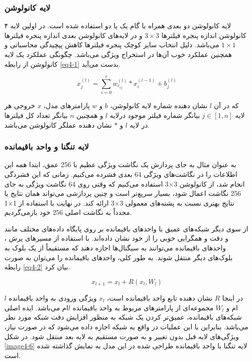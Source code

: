 \subsubsection{لایه كانولوشن}
۴ لایه کانولوشن دو بعدی همراه با گام   یک یا دو استفاده شده است. در اولین لایه کانولوشن‌ اندازه پنجره فیلترها $3 \times 3$ و در لایه‌های کانولوشن بعدی اندازه پنجره فیلترها $1 \times 1$ می‌باشد. دلیل انتخاب سایز کوچک پنجره فیلترها کاهش پیچیدگی محاسباتی و همچنین عملکرد خوب آن‌ها در استخراج ویژگی می‌باشد. چگونگی عملکرد یک لایه کانولوشن از رابطه \ref{eq4-1} بدست می‌آید.

\begin{equation}	
x_j^{(l)} =\sum_{i=0}^{c} w_{c_{ij}}^{(l)}\ast x_i^{(l-1) }+ b_j^{(l)} 
\label{eq4-1}
\end{equation}

\noindent
که در آن $l$ نشان دهنده شماره لایه کانولوشن، $b$ و $w$ پارامترهای مدل، $x$ خروجی هر لایه $j\in[1,n]$ بیانگر شماره فیلتر موجود درلایه $l$ و همچنین $n$ بیانگر تعداد کل فیلترها در لایه $l$ و $\ast$ نشان دهنده عملگر کانولوشن می‌باشد.

\subsubsection{لایه تنگنا و واحد باقیمانده}
به عنوان مثال به جای پردازش یک نگاشت ویژگی عظیم با 256 عمق، ابتدا همه این اطلاعات را در نگاشت‌های ویژگی 64 بعدی فشرده می‌کنیم. زمانی که این فشردگی انجام شد، از کانولوشن 3×3 استفاده می‌کنیم که وقتی روی 64 نگاشت ویژگی به جای 256 نگاشت اعمال شود، بسیار سریع‌تر است و چنین پردازشی می‌تواند همان نتایج یا نتایج بهتری نسبت به پشته‌های معمولی 3×3 ارائه کند. در نهایت با استفاده از 1×1 مجدداً به نگاشت اصلی 256 خود بازمی‌گردیم.

\noindent
از سوی دیگر شبکه‌های عمیق با واحدهای باقیمانده  بر روی پایگاه داده‌های مختلف مانند   و  دقت و همگرایی خوبی را از خود نشان داده‌اند. با استفاده از مسیرهای پرش ، واحدهای باقیمانده می‌توانند به سیگنال‌ها اجازه دهند که مستقیماً از یک بلوک به بلوک‌های دیگر منتقل شوند. به طور کلی، واحدهای باقیمانده را می‌توان به صورت رابطه \ref{eq4-2} بیان کرد.

\begin{equation}
x_{l+1}=x_l+R(x_l ,W_l)
\label{eq4-2}
\end{equation}

\noindent
در اینجا $R$ نشان دهنده تابع واحد باقیمانده است، $x_l$ ویژگی ورودی به واحد باقیمانده $l$ ام و $W_l$ مجموعه‌ای از پارامترهای مربوط به واحد باقیمانده $l$ام می‌باشد. ایده اصلی شبکه‌های باقیمانده، عمیق‌تر کردن یک شبکه به منظور افزایش دقت شبکه مورد نظر می‌باشد. بنابراین با این عملیات در واقع به شبکه اجازه داده می‌شود که در صورت نیاز، ویژگی‌های لایه قبل بدون تغییر و به صورت مستقیم به لایه بعد منتقل شود. در شکل \ref{image4-6} لایه تنگنا با واحد باقیمانده طراحی شده در این مدل به نمایش گذاشته شده است.

